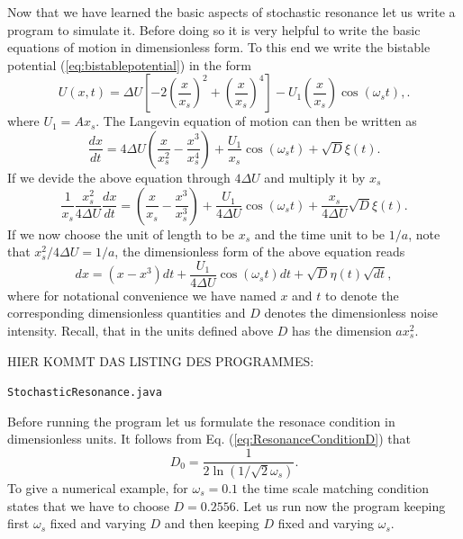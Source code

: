 Now that we have learned the basic aspects of stochastic resonance let us 
write a program to simulate it. Before doing so it is very helpful to write
the basic equations of motion in dimensionless form. To this end we write
the bistable potential (\ref{eq:bistablepotential}) in the form
\begin{equation}
  \label{eq:bistabledimless}
  U(x,t) = \Delta U \left[ -2\left( \frac{x}{x_s} \right)^2 
                           + \left( \frac{x}{x_s} \right)^4 \right] - 
                 U_1 \left(\frac{x}{x_s} \right) \cos(\omega_s t),.
\end{equation}
where $U_1 = A x_s$. The Langevin equation of motion can then be written as
\begin{equation}
  \label{eq:langevindimless1}
  \frac{dx}{dt} = 4 \Delta U \left( \frac{x}{x_s^2} - 
                   \frac{x^3}{x_s^4} \right)
                  + \frac{U_1}{x_s} \cos(\omega_s t)
                  + \sqrt{D} \xi(t).
\end{equation}
If we devide the above equation through $4 \Delta U$ and multiply it by $x_s$
\begin{equation}
  \label{eq:langevindimless2}
  \frac{1}{x_s} \frac{x_s^2}{4 \Delta U} \frac{dx}{dt} 
 =  \left( \frac{x}{x_s} - 
                   \frac{x^3}{x_s^3} \right)
                  + \frac{U_1}{ 4 \Delta U } \cos(\omega_s t)
                  + \frac{x_s}{4 \Delta U}\sqrt{D} \xi(t).
\end{equation}
If we now choose the unit of length to be $x_s$ and the time unit to be
$1/a$, note that $x_s^2/4 \Delta U = 1/a$, the dimensionless form of the above
equation reads
\begin{equation}
  \label{eq:langevindimless3}
  dx 
 =  \left( x - 
              x^3 \right)dt 
                  + \frac{U_1}{ 4 \Delta U} \cos(\omega_s t)dt
                  + \sqrt{D} \eta(t) \sqrt{dt},
\end{equation}
where for notational convenience we have named $x$ and $t$ to denote the 
corresponding dimensionless quantities and $D$ denotes the dimensionless
noise intensity. Recall, that in the units defined above $D$ has the dimension
$a x_s^2$.

HIER KOMMT DAS LISTING DES PROGRAMMES:

\verb|StochasticResonance.java|

Before running the program let us formulate the resonace condition in
dimensionless units. It follows from Eq. (\ref{eq:ResonanceConditionD}) that
\begin{equation}
  \label{eq:ResonanceConditionDless}
  D_0= \frac{1}{2 \ln (1/\sqrt{2} \omega_s)}.
\end{equation}
To give a numerical example, for $\omega_s= 0.1$ the  time scale matching
condition states that we have to choose $D= 0.2556$. Let us run now the
program keeping first $\omega_s$ fixed and varying $D$ and then keeping $D$
fixed and varying $\omega_s$.



